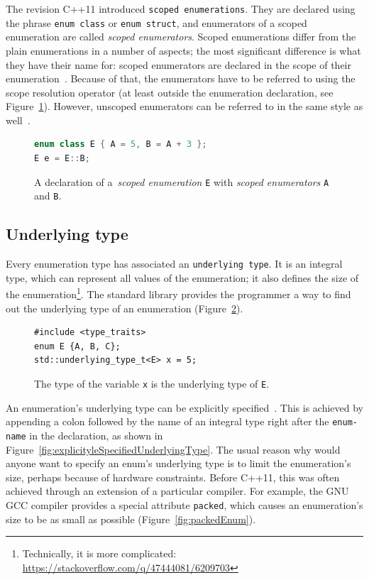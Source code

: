 \documentclass[nolot,nolof,nocover,printed]{fithesis3}
\newcommand{\stdN}[2]{\cite[#2]{#1}\xspace}
\begin{document}
The revision C++11 introduced \texttt{scoped enumerations}. They are declared using the phrase \texttt{enum class} or \texttt{enum struct}, and enumerators of a scoped enumeration are called \textit{scoped enumerators}. Scoped enumerations differ from the plain enumerations in a number of aspects; the most significant difference is what they have their name for: scoped enumerators are declared in the scope of their enumeration~\stdN{n4296}{\S 7.2/11}. Because of that, the enumerators have to be referred to using the scope resolution operator (at least outside the enumeration declaration, see Figure~\ref{fig:scopedEnumDecl}). However, unscoped enumerators can be referred to in the same style as well~\stdN{n4296}{\S 5.1.1/11}.


\begin{figure}
\begin{lstlisting}[language=C++]
enum class E { A = 5, B = A + 3 };
E e = E::B;
\end{lstlisting}
\caption{A declaration of a~\textit{scoped enumeration} \texttt{E} with \textit{scoped enumerators} \texttt{A} and \texttt{B}.}
\label{fig:scopedEnumDecl}
\end{figure}

\subsection{Underlying type}

Every enumeration type has associated an \texttt{underlying type}. It is an integral type, which can represent all values of the enumeration; it also defines the size of the enumeration\footnote{Technically, it is more complicated: \url{https://stackoverflow.com/q/47444081/6209703}}. The standard library provides the programmer a way to find out the underlying type of an enumeration (Figure~\ref{fig:stdUnderlyingType}).

\begin{figure}[ht]
\begin{lstlisting}
#include <type_traits>
enum E {A, B, C};
std::underlying_type_t<E> x = 5;
\end{lstlisting}
\caption{The type of the variable \texttt{x} is the underlying type of \texttt{E}.}
\label{fig:stdUnderlyingType}
\end{figure}

An enumeration's underlying type can be explicitly specified~\stdN{n4296}{\S 7.2/5}. This is achieved by appending a colon followed by the name of an integral type right after the \texttt{enum-name} in the declaration, as shown in Figure~\ref{fig:explicityleSpecifiedUnderlyingType}. The usual reason why would anyone want to specify an enum's underlying type is to limit the enumeration's size, perhaps because of hardware constraints. Before C++11, this was often achieved through an extension of a particular compiler. For example, the GNU GCC compiler provides a special attribute \texttt{packed}, which causes an enumeration's size to be as small as possible (Figure~\ref{fig:packedEnum}).
\end{document}
